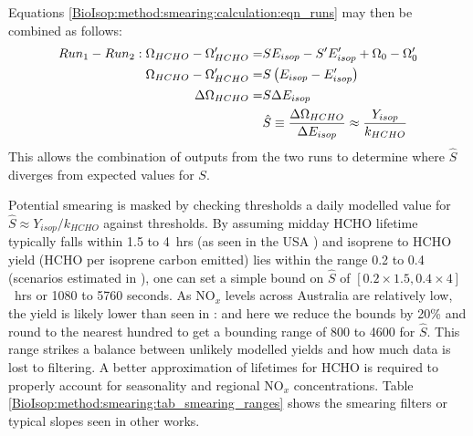       Equations \ref{BioIsop:method:smearing:calculation:eqn_runs} may then be combined as follows:
      \begin{eqnarray}
        Run_1-Run_2 : \Omega_{HCHO} - \Omega_{HCHO}' = & S E_{isop} - S' E_{isop}' +\Omega_0 - \Omega_0' \notag \\
        \Omega_{HCHO} - \Omega_{HCHO}' = & S \left( E_{isop} - E_{isop}' \right) \notag \\
        \Delta \Omega_{HCHO} = & S \Delta E_{isop}  \notag \\
        & \hat{S} \equiv \frac{\Delta{\Omega_{HCHO}}}{\Delta E_{isop}} \approx \frac{Y_{isop}}{k_{HCHO}} \label{BioIsop:method:smearing:calculation:eqn_hats}
      \end{eqnarray}
      This allows the combination of outputs from the two runs to determine where $\hat{S}$ diverges from expected values for $S$.
      
      Potential smearing is masked by checking thresholds a daily modelled value for $\hat{S} \approx Y_{isop}/k_{HCHO}$ against thresholds.
      By assuming midday HCHO lifetime typically falls within 1.5 to 4~hrs (as seen in the USA \parencite[e.g.][]{Palmer2006,Wolfe2016}) and isoprene to HCHO yield (HCHO per isoprene carbon emitted) lies within the range 0.2 to 0.4 (scenarios estimated in \textcite{Palmer2003}), one can set a simple bound on $\hat{S}$ of $[0.2 \times 1.5, 0.4 \times 4]$~hrs or 1080 to 5760 seconds.
      As NO$_x$ levels across Australia are relatively low, the yield is likely lower than seen in \textcite{Palmer2003}: and here we reduce the bounds by 20\% and round to the nearest hundred to get a bounding range of 800 to 4600 for $\hat{S}$. 
      This range strikes a balance between unlikely modelled yields and how much data is lost to filtering.
      A better approximation of lifetimes for HCHO is required to properly account for seasonality and regional NO$_x$ concentrations.
      Table \ref{BioIsop:method:smearing:tab_smearing_ranges} shows the smearing filters or typical slopes seen in other works.
      

